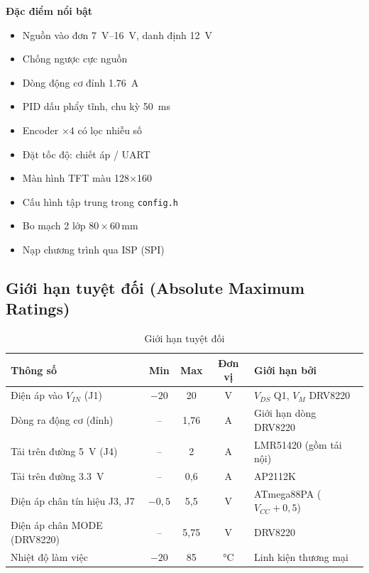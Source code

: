 \begin{tcolorbox}[colback=white,colframe=hustred,title={\bfseries UNIDRIVE LITE -- Single-Channel Closed-Loop Brushed DC Motor Controller},fonttitle=\large]
\begin{minipage}[t]{0.48\linewidth}
\textbf{Đặc điểm nổi bật}
\begin{itemize}[leftmargin=*,itemsep=0pt]
  \item Nguồn vào đơn \SIrange{7}{16}{\volt}, danh định \SI{12}{\volt}
  \item Chống ngược cực nguồn
  \item Dòng động cơ đỉnh \SI{1.76}{\ampere}
  \item PID dấu phẩy tĩnh, chu kỳ \SI{50}{\milli\second}
  \item Encoder $\times4$ có lọc nhiễu số
\end{itemize}
\end{minipage}\hfill
\begin{minipage}[t]{0.48\linewidth}
\textbf{\phantom{x}}
\begin{itemize}[leftmargin=*,itemsep=0pt]
  \item Đặt tốc độ: chiết áp / UART
  \item Màn hình TFT màu 128$\times$160
  \item Cấu hình tập trung trong \texttt{config.h}
  \item Bo mạch 2 lớp 80\,$\times$\,60\,mm
  \item Nạp chương trình qua ISP (SPI)
\end{itemize}
\end{minipage}
\end{tcolorbox}

\subsection{Giới hạn tuyệt đối (Absolute Maximum Ratings)}
\begin{table}[H]
\centering\small
\caption{Giới hạn tuyệt đối}
\label{tab:absmax}
\begin{tabularx}{\linewidth}{@{}Xccc>{\raggedright\arraybackslash}p{4.2cm}@{}}
\toprule
\textbf{Thông số} & \textbf{Min} & \textbf{Max} & \textbf{Đơn vị} & \textbf{Giới hạn bởi}\\
\midrule
Điện áp vào $V_{IN}$ (J1) & $-20$ & 20 & \si{\volt} & $V_{DS}$ Q1, $V_{M}$ DRV8220\\
Dòng ra động cơ (đỉnh) & -- & 1,76 & \si{\ampere} & Giới hạn dòng DRV8220\\
Tải trên đường \SI{5}{\volt} (J4) & -- & 2 & \si{\ampere} & LMR51420 (gồm tải nội)\\
Tải trên đường \SI{3.3}{\volt} & -- & 0,6 & \si{\ampere} & AP2112K\\
Điện áp chân tín hiệu J3, J7 & $-0,5$ & 5,5 & \si{\volt} & ATmega88PA ($V_{CC}+0,5$)\\
Điện áp chân MODE (DRV8220) & -- & 5,75 & \si{\volt} & DRV8220\\
Nhiệt độ làm việc & $-20$ & 85 & \si{\celsius} & Linh kiện thương mại\\
\bottomrule
\end{tabularx}
\end{table}

